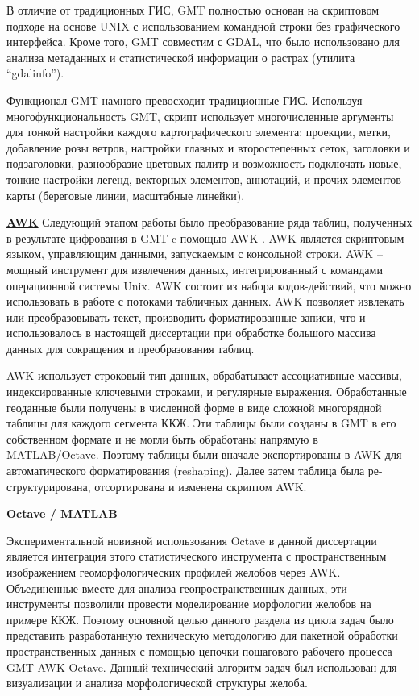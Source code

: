 В отличие от традиционных ГИС, GMT полностью основан на скриптовом подходе на основе UNIX с использованием командной строки без графического интерфейса. Кроме того, GMT совместим с GDAL, что было использовано для анализа метаданных и статистической информации о растрах (утилита “gdalinfo”). 

Функционал GMT намного превосходит традиционные ГИС. Используя многофункциональность GMT, скрипт использует многочисленные аргументы для тонкой настройки каждого картографического элемента: проекции, метки, добавление розы ветров, настройки главных и второстепенных сеток, заголовки и подзаголовки, разнообразие цветовых палитр и возможность подключать новые, тонкие настройки легенд, векторных элементов, аннотаций, и прочих элементов карты (береговые линии, масштабные линейки).

\underline{\textbf{AWK}} 
Следующий этапом работы было преобразование ряда таблиц, полученных в результате цифрования в GMT c помощью AWK \cite{Aho}. AWK является скриптовым языком, управляющим данными, запускаемым с консольной строки. AWK – мощный инструмент для извлечения данных, интегрированный с командами операционной системы Unix. AWK состоит из набора кодов-действий, что можно использовать в работе с потоками табличных данных. AWK позволяет извлекать или преобразовывать текст, производить форматированные записи, что и использовалось в настоящей диссертации при обработке большого массива данных для сокращения и преобразования таблиц. 

AWK использует строковый тип данных, обрабатывает ассоциативные массивы, индексированные ключевыми строками, и регулярные выражения. Обработанные геоданные были получены в численной форме в виде сложной многорядной таблицы для каждого сегмента ККЖ. Эти таблицы были созданы в GMT в его собственном формате и не могли быть обработаны напрямую в MATLAB/Octave. Поэтому таблицы были вначале экспортированы в AWK для автоматического форматирования (reshaping). Далее затем таблица была ре-структурирована, отсортирована и изменена скриптом AWK.

\underline{\textbf{Octave / MATLAB}} 

Экспериментальной новизной использования Octave в данной диссертации является интеграция этого статистического инструмента с пространственным изображением геоморфологических профилей желобов через AWK. Объединенные вместе для анализа геопространственных данных, эти инструменты позволили провести моделирование морфологии желобов на примере ККЖ. Поэтому основной целью данного раздела из цикла задач было представить разработанную техническую методологию для пакетной обработки пространственных данных с помощью цепочки пошагового рабочего процесса GMT-AWK-Octave. Данный технический алгоритм задач был использован для визуализации и анализа морфологической структуры желоба. 


